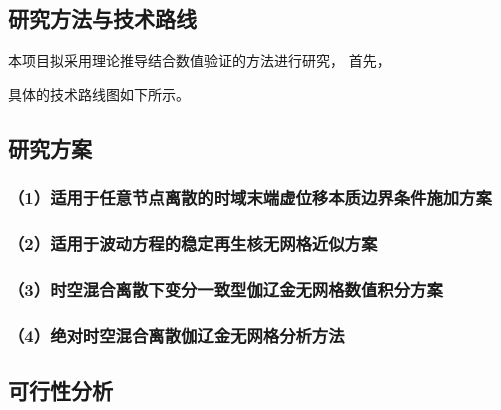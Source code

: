 \setlength{\abovedisplayskip}{0pt}
\setlength{\belowdisplayskip}{0pt}

\subsection{研究方法与技术路线}

本项目拟采用理论推导结合数值验证的方法进行研究，
首先，

具体的技术路线图如下所示。

\subsection{研究方案}

\subsubsection*{\bfseries （1）适用于任意节点离散的时域末端虚位移本质边界条件施加方案}

\subsubsection*{\bfseries （2）适用于波动方程的稳定再生核无网格近似方案}


\subsubsection*{\bfseries （3）时空混合离散下变分一致型伽辽金无网格数值积分方案}

\subsubsection*{\bfseries （4）绝对时空混合离散伽辽金无网格分析方法}

\subsection{可行性分析}

